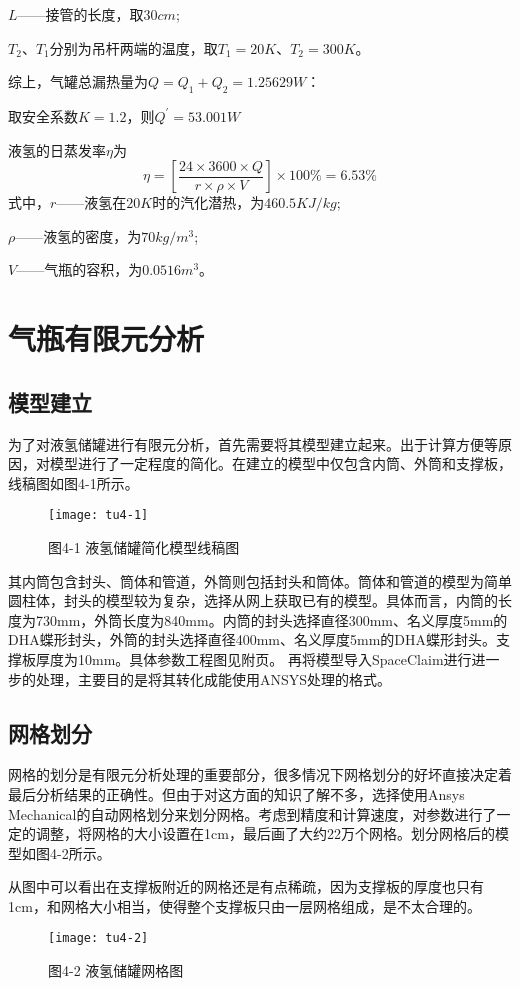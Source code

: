 \documentclass[UTF8,a4paper]{ctexart}
\newcommand{\upcite}[1]{\textsuperscript{\textsuperscript{\cite{#1}}}}
\begin{document}
	$L$——接管的长度，取$30cm$;
	
	$T_{2}$、$T_{1}$分别为吊杆两端的温度，取$T_{1}=20K$、$T_{2}=300K$。
	
	综上，气罐总漏热量为$Q=Q_{1}+Q_{2}=1.25629W$：
	
	取安全系数$K=1.2$，则$Q^{'}=53.001W$
	
	液氢的日蒸发率$\eta$为
	\begin{equation*}
	\eta=\left[\dfrac{24\times3600\times Q}{r\times\rho\times V}\right]\times 100 \% =6.53\%
	\end{equation*}
	式中，$r$——液氢在$20K$时的汽化潜热，为$460.5KJ/kg$;
	
	$\rho$——液氢的密度，为$70kg/m^{3}$;
	
	$V$——气瓶的容积，为$0.0516m^{3}$。
	
	\section{气瓶有限元分析}
	\subsection{模型建立}
	为了对液氢储罐进行有限元分析，首先需要将其模型建立起来。出于计算方便等原因，对模型进行了一定程度的简化。在建立的模型中仅包含内筒、外筒和支撑板，线稿图如图4-1所示。
	\begin{figure}[H]
		\centering
		\texttt{[image: tu4-1]}
		\caption*{图4-1 液氢储罐简化模型线稿图}
		\label{fig:tu4-1}
	\end{figure}
	其内筒包含封头、筒体和管道，外筒则包括封头和筒体。筒体和管道的模型为简单圆柱体，封头的模型较为复杂，选择从网上获取已有的模型。具体而言，内筒的长度为730mm，外筒长度为840mm。内筒的封头选择直径300mm、名义厚度5mm的DHA蝶形封头\upcite{ref19}，外筒的封头选择直径400mm、名义厚度5mm的DHA蝶形封头\upcite{ref20}。支撑板厚度为10mm。具体参数工程图见附页。
	再将模型导入SpaceClaim进行进一步的处理，主要目的是将其转化成能使用ANSYS处理的格式。
	\subsection{网格划分}
	网格的划分是有限元分析处理的重要部分，很多情况下网格划分的好坏直接决定着最后分析结果的正确性。但由于对这方面的知识了解不多，选择使用Ansys Mechanical的自动网格划分来划分网格。考虑到精度和计算速度，对参数进行了一定的调整，将网格的大小设置在1cm，最后画了大约22万个网格。划分网格后的模型如图4-2所示。
	
	从图中可以看出在支撑板附近的网格还是有点稀疏，因为支撑板的厚度也只有1cm，和网格大小相当，使得整个支撑板只由一层网格组成，是不太合理的。
	\begin{figure}[H]
		\centering
		\texttt{[image: tu4-2]}
		\caption*{图4-2 液氢储罐网格图}
		\label{fig:tu4-2}
	\end{figure}
\end{document}
